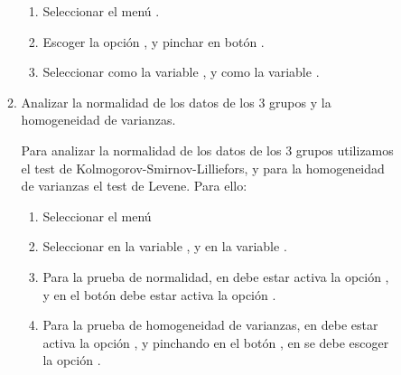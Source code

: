 \begin{description}
\begin{enumerate}[leftmargin=*]
\begin{enumerate}
\begin{indicacion}

\begin{enumerate}
\item Seleccionar el menú .

\item Escoger la opción , y pinchar en botón .
\item Seleccionar como  la variable , y como  la variable .
\end{enumerate}
\end{indicacion}

\item Analizar la normalidad de los datos de los 3 grupos y la homogeneidad de varianzas.
\begin{indicacion}
Para analizar la normalidad de los datos de los 3 grupos utilizamos el test de Kolmogorov-Smirnov-Lilliefors, y para la homogeneidad de varianzas el test de Levene. Para ello:
\begin{enumerate}
\item Seleccionar el menú 
\item Seleccionar en  la variable , y en  la variable . 
\item Para la prueba de normalidad, en  debe estar activa la opción , y en el botón  debe estar activa la opción .
\item Para la prueba de homogeneidad de varianzas, en  debe estar activa la opción , y pinchando en el botón , en  se debe escoger la opción .
\end{enumerate}
\end{indicacion}


\end{enumerate}
\end{enumerate}
\end{description}
